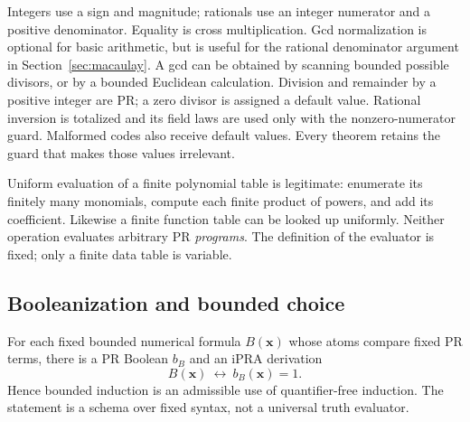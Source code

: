 Integers use a sign and magnitude; rationals use an integer numerator and a
positive denominator. Equality is cross multiplication. Gcd normalization is
optional for basic arithmetic, but is useful for the rational denominator
argument in Section~\ref{sec:macaulay}. A gcd can be obtained by scanning
bounded possible divisors, or by a bounded Euclidean calculation. Division and
remainder by a positive integer are PR; a zero divisor is assigned a default
value. Rational inversion is totalized and its field laws are used only with
the nonzero-numerator guard. Malformed codes also receive default values.
Every theorem retains the guard that makes those values irrelevant.

Uniform evaluation of a finite polynomial table is legitimate: enumerate its
finitely many monomials, compute each finite product of powers, and add its
coefficient. Likewise a finite function table can be looked up uniformly.
Neither operation evaluates arbitrary PR \emph{programs}. The definition of
the evaluator is fixed; only a finite data table is variable.

\subsection{Booleanization and bounded choice}

\begin{lemma}
\label{lem:booleanization}
For each fixed bounded numerical formula $B(\boldsymbol x)$ whose atoms compare
fixed PR terms, there is a PR Boolean $b_B$ and an iPRA derivation
\[
 B(\boldsymbol x)\ \longleftrightarrow\ b_B(\boldsymbol x)=1.
\]
Hence bounded induction is an admissible use of quantifier-free induction.
The statement is a schema over fixed syntax, not a universal truth evaluator.
\end{lemma}

